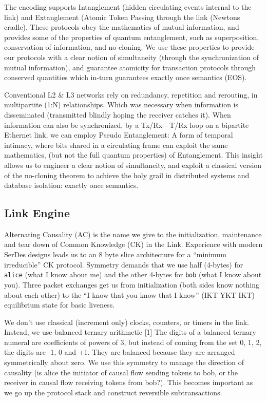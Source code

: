 \documentclass[../OAE-SPEC-MAIN.tex]{subfiles}
\begin{document}
The encoding supports Intanglement (hidden circulating events internal to the link) and Extanglement (Atomic Token Passing through the link (Newtons cradle). These protocols obey the mathematics of mutual information, and provides some of the properties of quantum entanglement, such as superposition, conservation of information, and no-cloning. We use these properties to provide our protocols with a clear notion of simultaneity (through the synchronization of mutual information), and guarantee atomicity for transaction protocols through conserved quantities which in-turn guarantees exactly once semantics (EOS).

Conventional L2 \& L3 networks rely on redundancy, repetition and rerouting, in multipartite (1:N) relationships. Which was necessary when information is disseminated (transmitted blindly hoping the receiver catches it). When information can also be synchronized, by a Tx/Rx—T/Rx loop on a bipartite Ethernet link, we can employ Pseudo Entanglement: A form of temporal intimacy, where bits shared in a circulating frame can exploit the same mathematics, (but not the full quantum properties) of Entanglement. This insight allows us to engineer a clear notion of simultaneity, and exploit a classical version of the no-cloning theorem to achieve the holy grail in distributed systems and database isolation: exactly once semantics.

\subsection{Link Engine}

Alternating Causality (AC) is the name we give to the initialization, maintenance and tear down of Common Knowledge (CK) in the Link. Experience with modern SerDes designs leads us to an 8 byte slice architecture for a “minimum irreducible” CK protocol. Symmetry demands that we use half (4-bytes) for \texttt{alice} (what I know about me) and the other 4-bytes for \texttt{bob} (what I know about you). Three packet exchanges get us from initialization (both sides know nothing about each other) to the “I know that you know that I know” (IKT YKT IKT) equilibrium state for basic liveness. 

We don’t use classical (increment only) clocks, counters, or timers in the link. Instead, we use balanced ternary arithmetic [1] The digits of a balanced ternary numeral are coefficients of powers of 3, but instead of coming from the set {0, 1, 2}, the digits are {-1, 0 and +1}. They are balanced because they are arranged symmetrically about zero.  We use this symmetry to manage the direction of causality (is alice the initiator of causal flow sending tokens to bob, or the receiver in causal flow receiving tokens from bob?).  This becomes important as we go up the protocol stack and construct reversible subtransactions.  
\end{document}
